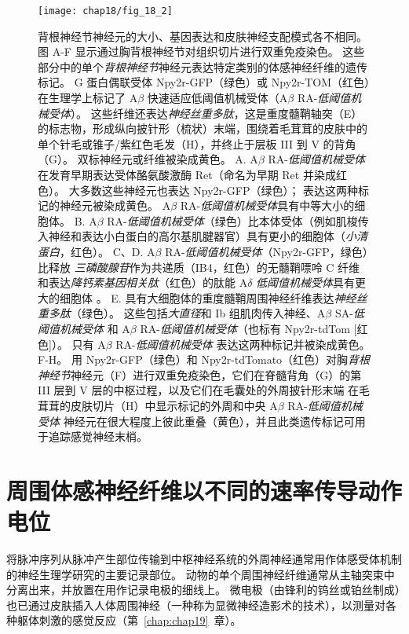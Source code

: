 \begin{figure}[htbp]
	\centering
	\texttt{[image: chap18/fig\_18\_2]}
	\caption{背根神经节神经元的大小、基因表达和皮肤神经支配模式各不相同\cite{li2011functional}。
		图 A-F 显示通过胸背根神经节对组织切片进行双重免疫染色。
		这些部分中的单个\textit{背根神经节}神经元表达特定类别的体感神经纤维的遗传标记。
		G 蛋白偶联受体 Npy2r-GFP（绿色）或 Npy2r-TOM（红色）在生理学上标记了 A$\beta$ 快速适应低阈值机械受体（A$\beta$ RA-\textit{低阈值机械受体}）。
		这些纤维还表达\textit{神经丝重多肽}，这是重度髓鞘轴突（E）的标志物，形成纵向披针形（梳状）末端，围绕着毛茸茸的皮肤中的单个针毛或锥子/紫红色毛发（H），并终止于层板 III 到 V 的背角（G）。 
		双标神经元或纤维被染成黄色。
		A. A$\beta$ RA-\textit{低阈值机械受体}在发育早期表达受体酪氨酸激酶 Ret（命名为早期 Ret 并染成红色）。
		大多数这些神经元也表达 Npy2r-GFP（绿色）；
		表达这两种标记的神经元被染成黄色。 A$\beta$ RA-\textit{低阈值机械受体}具有中等大小的细胞体。
		B. A$\beta$ RA-\textit{低阈值机械受体}（绿色）比本体受体（例如肌梭传入神经和表达小白蛋白的高尔基肌腱器官）具有更小的细胞体（\textit{小清蛋白}，红色）。
		C、D. A$\beta$ RA-\textit{低阈值机械受体}（Npy2r-GFP，绿色）比释放 \textit{三磷酸腺苷}作为共递质（IB4，红色）的无髓鞘嘌呤 C 纤维和表达\textit{降钙素基因相关肽}（红色）的肽能 A$\delta$ \textit{低阈值机械受体}具有更大的细胞体 。
		E. 具有大细胞体的重度髓鞘周围神经纤维表达\textit{神经丝重多肽}（绿色）。
		这些包括\textit{大直径}和 Ib 组肌肉传入神经、A$\beta$ SA-\textit{低阈值机械受体} 和 A$\beta$ RA-\textit{低阈值机械受体}（也标有 Npy2r-tdTom [红色]）。
		只有 A$\beta$ RA-\textit{低阈值机械受体} 表达这两种标记并被染成黄色。F-H。
		用 Npy2r-GFP（绿色）和 Npy2r-tdTomato（红色）对胸\textit{背根神经节}神经元（F）进行双重免疫染色，它们在脊髓背角（G）的第 III 层到 V 层的中枢过程，以及它们在毛囊处的外周披针形末端 在毛茸茸的皮肤切片（H）中显示标记的外周和中央 A$\beta$ RA-\textit{低阈值机械受体} 神经元在很大程度上彼此重叠（黄色），并且此类遗传标记可用于追踪感觉神经末梢。}
	\label{fig:18_2}
\end{figure}



\section{周围体感神经纤维以不同的速率传导动作电位}

将脉冲序列从脉冲产生部位传输到中枢神经系统的外周神经通常用作体感受体机制的神经生理学研究的主要记录部位。
动物的单个周围神经纤维通常从主轴突束中分离出来，并放置在用作记录电极的细线上。
微电极（由锋利的钨丝或铂丝制成）也已通过皮肤插入人体周围神经（一种称为显微神经造影术的技术），以测量对各种躯体刺激的感觉反应（第~\ref{chap:chap19}~章）。


